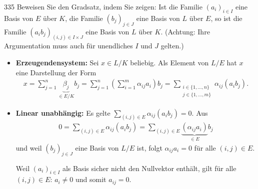 \begin{algebraUE}{335}
Beweisen Sie den Gradsatz, indem Sie zeigen: Ist die Familie $(a_i)_{i \in I}$
eine Basis von $E$ über $K$, die Familie $(b_j)_{j \in J}$ eine Basis von $L$ über $E$,
so ist die Familie $(a_ib_j)_{(i,j) \in I \times J}$ eine Basis von $L$ über $K$.
(Achtung: Ihre Argumentation muss auch für unendliches $I$ und $J$ gelten.)

\end{algebraUE}

\begin{solution}
  \begin{itemize}
      \item \textbf{Erzeugendensystem:} Sei $x \in L/K$ beliebig. Als Element von $L/E$ hat $x$ eine Darstellung der Form
  \begin{align}
      x = \sum_{j=1}^n \underbrace{\beta_j}_{\in E/K} b_j = \sum_{j=1}^n \left(\sum_{i=1}^m \alpha_{ij} a_i \right) b_j = \sum_{\substack{i \in \{1, ..., n\} \\ {j\in \{1,...,m\}}}} \alpha_{ij} (a_i b_j).
  \end{align}
      \item \textbf{Linear unabhängig:} Es gelte $\sum_{(i,j) \in E} \alpha_{ij} (a_i b_j) = 0.$  Aus
      \begin{align}
          0 = \sum_{(i,j) \in E} \alpha_{ij} (a_i b_j) = \sum_{(i,j) \in E} \underbrace{(\alpha_{ij} a_i)}_{\in E} b_j
      \end{align}
      und weil $(b_j)_{j \in J}$ eine Basis von $L/E$ ist, folgt $\alpha_{ij} a_i = 0$ für alle $(i,j) \in E.$

      Weil $(a_i)_{i \in I}$ als Basis sicher nicht den Nullvektor enthält, gilt für alle $(i,j) \in E$: $a_i \neq 0$ und somit $a_{ij} = 0$.
  \end{itemize}
\end{solution}
